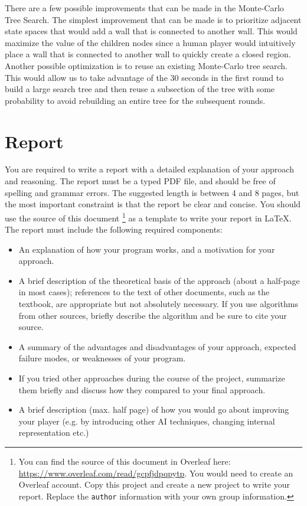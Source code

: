 \documentclass[twoside,11pt]{article}
\begin{document}
There are a few possible improvements that can be made in the Monte-Carlo Tree Search.
The simplest improvement that can be made is to prioritize adjacent state spaces that would add a wall that is connected to another wall.
This would maximize the value of the children nodes since a human player would intuitively place a wall that is connected to another wall to quickly create a closed region.
Another possible optimization is to reuse an existing Monte-Carlo tree search.
This would allow us to take advantage of the 30 seconds in the first round to build a large search tree and then reuse a subsection of the tree with some probability to avoid rebuilding an entire tree for the subsequent rounds.

\section{Report}

You are required to write a report with a detailed explanation of your approach and reasoning. The report must be a typed PDF file, and should be free of spelling and grammar errors. The suggested length is between 4 and 8 pages, but the most important constraint is that the report be clear and concise. You should use the source of this document \footnote{You can find the source of this document in Overleaf here: \href{https://www.overleaf.com/read/gcpfjdpqpytp}{https://www.overleaf.com/read/gcpfjdpqpytp}. You would need to create an Overleaf account. Copy this project and create a new project to write your report. Replace the \texttt{author} information with your own group information.} as a template to write your report in \LaTeX.  The report must include the following required components:

\begin{itemize}
    \item An explanation of how your program works, and a motivation for your approach.
    \item A brief description of the theoretical basis of the approach (about a half-page in most cases); references to the text of other documents, such as the textbook, are appropriate but not absolutely necessary. If you use algorithms from other sources, briefly describe the algorithm and be sure to cite your source.
    \item A summary of the advantages and disadvantages of your approach, expected failure modes, or weaknesses of your program.
    \item If you tried other approaches during the course of the project, summarize them briefly and discuss how they compared to your final approach.
    \item A brief description (max. half page) of how you would go about improving your player (e.g. by introducing other AI techniques, changing internal representation etc.)
    
\end{itemize}

% 
\end{document}
